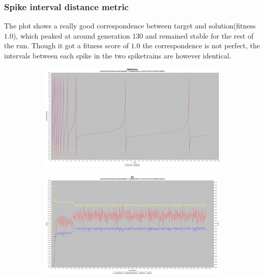 \documentclass[10pt]{article}
\begin{document}
		\subsubsection{Spike interval distance metric}
			The plot shows a really good correspondence between target and solution(fitness $1.0$), which peaked at around generation $130$ and remained stable for the rest of the run. Though it got a fitness score of $1.0$ the correspondence is not perfect, the intervals between each spike in the two spiketrains are however identical.
			\begin{figure}[H]
				\centering
					\begin{subfigure}{.5\textwidth}
						\centering
						\includegraphics[width=\linewidth]{./../images/izzy4/interval/plot.png}
						
						\label{fig:sub11a}
					\end{subfigure}%
					\begin{subfigure}{.5\textwidth}
						\centering
						\includegraphics[width=\linewidth]{./../images/izzy4/interval/prog.png}
						
						\label{fig:sub11b}
					\end{subfigure}
					
					\label{fig:plot11}
			\end{figure}
\end{document}
